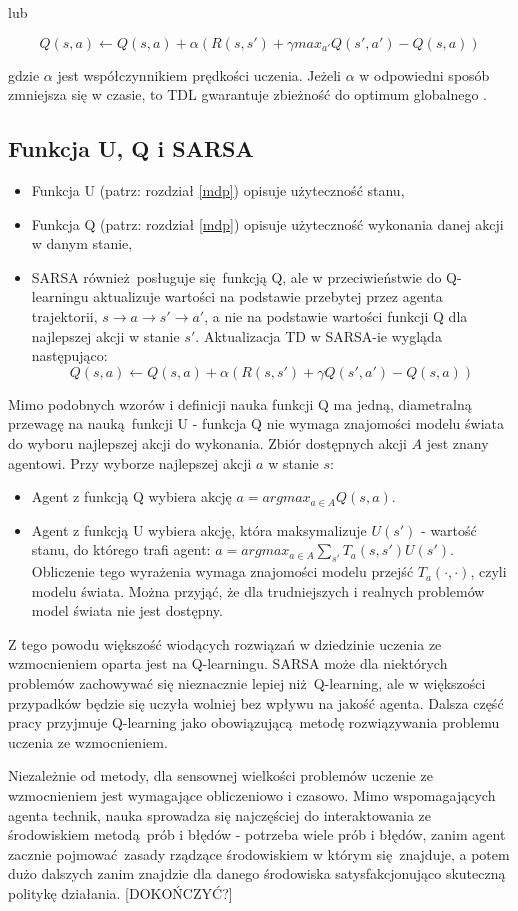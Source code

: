 lub

$$Q(s,a) \leftarrow Q(s,a) + \alpha (R(s,s') + \gamma max_{a'}Q(s',a') - Q (s,a))$$


gdzie $\alpha$ jest współczynnikiem prędkości uczenia. Jeżeli $\alpha$ w odpowiedni sposób zmniejsza się w czasie, to TDL gwarantuje zbieżność do optimum globalnego \cite{wjaskowski2016}. 

\subsection{Funkcja U, Q i SARSA}\label{qlearning}
\begin{itemize}
\item Funkcja U (patrz: rozdział \ref{mdp}) opisuje użyteczność stanu,
\item Funkcja Q (patrz: rozdział \ref{mdp}) opisuje użyteczność wykonania danej akcji w danym stanie,
\item SARSA również posługuje się funkcją Q, ale w przeciwieństwie do Q-learningu aktualizuje wartości na podstawie przebytej przez agenta trajektorii, $ s \rightarrow a \rightarrow s' \rightarrow a'$, a nie na podstawie wartości funkcji Q dla najlepszej akcji w stanie $s'$. Aktualizacja TD w SARSA-ie wygląda następująco:
$$Q(s,a) \leftarrow Q(s,a) + \alpha (R(s,s') + \gamma Q(s',a') - Q (s,a))$$
\end{itemize}

Mimo podobnych wzorów i definicji nauka funkcji Q ma jedną, diametralną przewagę na nauką funkcji U - funkcja Q nie wymaga znajomości modelu świata do wyboru najlepszej akcji do wykonania. Zbiór dostępnych akcji $A$ jest znany agentowi. Przy wyborze najlepszej akcji $a$ w stanie $s$:
\begin{itemize}
\item Agent z funkcją Q wybiera akcję $a = argmax_{a \in A} Q(s,a)$.

\item Agent z funkcją U wybiera akcję, która maksymalizuje $U(s')$ - wartość stanu, do którego trafi agent: $a = argmax_{a \in A} \sum_{s'} T_a(s,s')U(s')$. Obliczenie tego wyrażenia wymaga znajomości modelu przejść $T_a(\cdot, \cdot)$, czyli modelu świata. Można przyjąć, że dla trudniejszych i realnych problemów model świata nie jest dostępny.
\end{itemize}

Z tego powodu większość wiodących rozwiązań w dziedzinie uczenia ze wzmocnieniem oparta jest na Q-learningu. SARSA może dla niektórych problemów zachowywać się nieznacznie lepiej niż Q-learning, ale w większości przypadków będzie się uczyła wolniej bez wpływu na jakość agenta. Dalsza część pracy przyjmuje Q-learning jako obowiązującą metodę rozwiązywania problemu uczenia ze wzmocnieniem.

Niezależnie od metody, dla sensownej wielkości problemów uczenie ze wzmocnieniem jest wymagające obliczeniowo i czasowo. Mimo wspomagających agenta technik, nauka sprowadza się najczęściej do interaktowania ze środowiskiem metodą prób i błędów - potrzeba wiele prób i błędów, zanim agent zacznie pojmować zasady rządzące środowiskiem w którym się znajduje, a potem dużo dalszych zanim znajdzie dla danego środowiska satysfakcjonująco skuteczną politykę działania.
[DOKOŃCZYĆ?]

